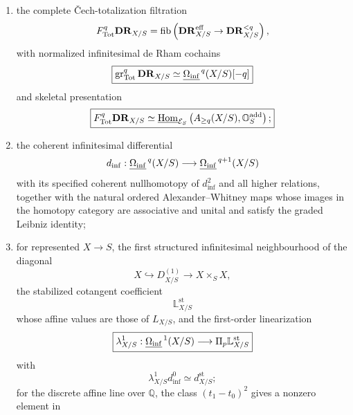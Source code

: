 \begin{theorem}
\begin{enumerate}
\[
\boxed{
    \mathbf{DR}^{\mathrm{full}}_{X/S}
    \simeq
    \Pi_{q_{\dR}}q_{\dR}^*\mathbb O_S^{\add}
    \simeq
    \underline{\Hom}_{\mathcal E_S}
    \left(
        \Sigma^\infty_{+,S}X_{\dR/S},
        \mathbb O_S^{\add}
    \right),
}
\]
and the effective or \v{C}ech de Rham algebra
\[
\boxed{
    \mathbf{DR}^{\mathrm{eff}}_{X/S}
    \simeq
    \Pi_{b_{X/S}}b_{X/S}^*\mathbb O_S^{\add}
    \simeq
    \underline{\Hom}_{\mathcal E_S}
    \left(
        \Sigma^\infty_{+,S}Q_{X/S},
        \mathbb O_S^{\add}
    \right),
}
\]
together with the canonical comparison
\[
\boxed{
    \rho_{X/S}:
    \mathbf{DR}^{\mathrm{full}}_{X/S}
    \longrightarrow
    \mathbf{DR}^{\mathrm{eff}}_{X/S};
}
\]
for represented smooth spectral morphisms, smooth effectivity identifies \(Q_{X/S}\) with
\(X_{\dR/S}\) and makes \(\rho_{X/S}\) an equivalence;
\item the complete \v{C}ech-totalization filtration
\[
    F_{\mathrm{Tot}}^q\mathbf{DR}_{X/S}
    =
    \operatorname{fib}
    \left(
        \mathbf{DR}^{\mathrm{eff}}_{X/S}
        \to
        \mathbf{DR}_{X/S}^{<q}
    \right),
\]
with normalized infinitesimal de Rham cochains
\[
\boxed{
    \operatorname{gr}_{\mathrm{Tot}}^q\mathbf{DR}_{X/S}
    \simeq
    \underline{\Omega_{\mathrm{inf}}}^{\,q}(X/S)[-q]
}
\]
and skeletal presentation
\[
\boxed{
    F_{\mathrm{Tot}}^q\mathbf{DR}_{X/S}
    \simeq
    \underline{\operatorname{Hom}}_{\mathcal E_S}
    \left(
        A_{\geq q}(X/S),
        \mathbb O_S^{\mathrm{add}}
    \right);
}
\]
\item the coherent infinitesimal differential
\[
    d_{\inf}:
    \underline{\Omega_{\mathrm{inf}}}^{\,q}(X/S)
    \longrightarrow
    \underline{\Omega_{\mathrm{inf}}}^{\,q+1}(X/S)
\]
with its specified coherent nullhomotopy of \(d_{\inf}^2\) and all higher relations, together with
the natural ordered Alexander--Whitney maps whose images in the homotopy category are associative and
unital and satisfy the graded Leibniz identity;
\item for represented \(X\to S\), the first structured infinitesimal neighbourhood of the diagonal
\[
    X\hookrightarrow D^{(1)}_{X/S}\longrightarrow X\times_SX,
\]
the stabilized cotangent coefficient
\[
    \mathbb L^{\mathrm{st}}_{X/S}
\]
whose affine values are those of \(L_{X/S}\), and the first-order linearization
\[
\boxed{
    \lambda^1_{X/S}:
    \underline{\Omega_{\mathrm{inf}}}^{\,1}(X/S)
    \longrightarrow
    \Pi_p\mathbb L^{\mathrm{st}}_{X/S}
}
\]
with
\[
\boxed{
    \lambda^1_{X/S}d_{\inf}^0
    \simeq
    d^{\mathrm{st}}_{X/S};
}
\]
for the discrete affine line over \(\mathbb Q\), the class \((t_1-t_0)^2\) gives a nonzero element in

\end{enumerate}
\end{theorem}
